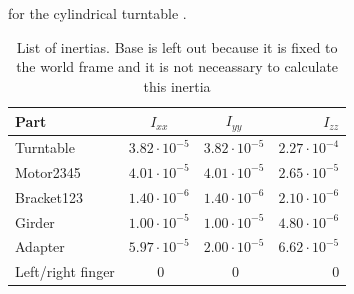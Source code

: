 for the cylindrical turntable \cite{Dupac}. 
\begin{table}[htbp]
\centering
\caption{List of inertias. Base is left out because it is fixed to the world frame and it is not neceassary to calculate this inertia}
\label{table:inertia}
    \begin{tabular}{l c c r}
        \toprule
        Part  &  $I_{xx}$ & $I_{yy}$ & $I_{zz}$\\
        \midrule
        Turntable & $3.82\cdot10^{-5}$ &  $3.82\cdot10^{-5}$ &$2.27\cdot10^{-4}$\\
        Motor2345 & $4.01\cdot10^{-5}$  & $4.01\cdot10^{-5}$  & $2.65\cdot10^{-5}$ \\
        Bracket123 & $1.40\cdot10^{-6} $ & $1.40\cdot10^{-6} $ & $2.10\cdot10^{-6} $ \\
        Girder & $1.00\cdot10^{-5} $ & $1.00\cdot10^{-5} $ & $4.80\cdot10^{-6} $\\
        Adapter & $5.97\cdot10^{-5} $ & $2.00\cdot10^{-5} $ & $6.62\cdot10^{-5} $\\
        Left/right finger & $~0$ & $~0$ & $0$\\
        \bottomrule
    \end{tabular}
\end{table}

